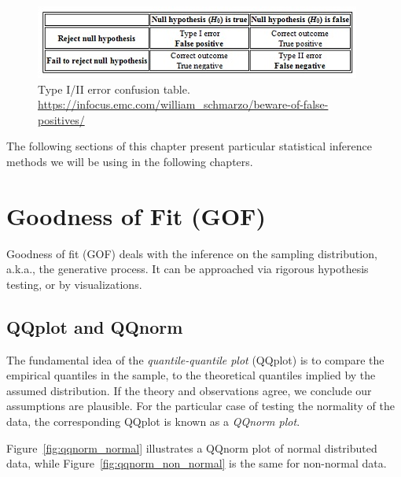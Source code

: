 \documentclass[12pt,a4paper]{report}
\theoremstyle{plain}
\theoremstyle{definition}
\begin{document}
\begin{figure}
\centering
\includegraphics[width=0.8\linewidth]{art/Beware-of-False-Positives-Chart-1}
\caption[Confusion Table]{Type I/II error confusion table. \newline \url{https://infocus.emc.com/william_schmarzo/beware-of-false-positives/}}
\label{fig:confusion_table}
\end{figure}


The following sections of this chapter present particular statistical inference methods we will be using in the following chapters.


\section{Goodness of Fit (GOF)}

Goodness of fit (GOF) deals with the inference on the sampling distribution, a.k.a., the generative process.
It can be approached via rigorous hypothesis testing, or by visualizations.

\subsection{QQplot and QQnorm}
\label{sec:qqplot}

The fundamental idea of the \emph{quantile-quantile plot} (QQplot) is to compare the empirical quantiles in the sample, to the theoretical quantiles implied by the assumed distribution. If the theory and observations agree, we conclude our assumptions are plausible. 
For the particular case of testing the normality of the data, the corresponding QQplot is known as a \emph{QQnorm plot}.

Figure~\ref{fig:qqnorm_normal} illustrates a QQnorm plot of normal distributed data, while Figure~\ref{fig:qqnorm_non_normal} is the same for non-normal data.
\end{document}
